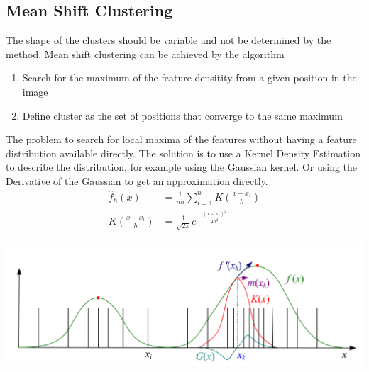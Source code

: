 \documentclass[11pt]{article}
\theoremstyle{definition}
\begin{document}
\subsection{Mean Shift Clustering}
The shape of the clusters should be variable and not be determined by the method. Mean shift clustering can be achieved by the algorithm
\begin{enumerate}
	\item Search for the maximum of the feature densitity from a given position in the image
	\item Define cluster as the set of positions that converge to the same maximum
\end{enumerate}
The problem to search for local maxima of the features without having a feature distribution available directly. The solution is to use a Kernel Density Estimation to describe the distribution, for example using the Gaussian kernel. Or using the Derivative of the Gaussian to get an approximation directly.
\begin{align*}
	\hat{f}_h(x) &= \frac{1}{nh}\sum_{i=1}^{n}K\left(\frac{x-x_i}{h}\right)\\
	K\left(\frac{x-x_i}{h}\right) &= \frac{1}{\sqrt{2\pi}} e^{-\frac{(x-x_i)^2}{2h^2}}
\end{align*}
\begin{center}
	\includegraphics[width=0.7\linewidth]{img/kernel_density_estimation}
\end{center}
\end{document}
